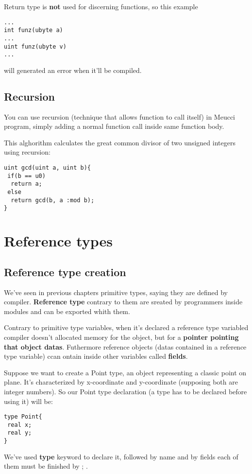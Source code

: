 \documentclass[10pt]{book}%
\renewcommand{\emph}[1]{\textbf{#1}}
\newenvironment{codeenv}{
\begin{mdframed}[backgroundcolor=black!20,topline=false,leftline=false,rightline=false,bottomline=false]
}
{\end{mdframed}}
\begin{document}
Return type is \emph{not} used for discerning functions, so this example
\begin{codeenv}
\begin{verbatim}
...
int funz(ubyte a)
...
uint funz(ubyte v)
...
\end{verbatim}
\end{codeenv}
will generated an error when it'll be compiled.

\section{Recursion}
You can use recursion (technique that allows function to call itself) in Meucci program, simply adding a normal function call inside same function body. 

This alghorithm calculates the great common divisor of two unsigned integers using recursion:
\begin{codeenv}
\begin{verbatim}
uint gcd(uint a, uint b){
 if(b == u0)
  return a;
 else
  return gcd(b, a :mod b);
}
\end{verbatim}
\end{codeenv}

\chapter{Reference types}
\section{Reference type creation}
We've seen in previous chapters primitive types, saying they are defined by compiler. \emph{Reference type} contrary to them are sreated by programmers inside modules and can be exported whith them.

Contrary to primitive type variables, when it's declared a reference type variabled compiler doesn't allocated memory for the object, but for a \emph{pointer pointing that object datas}. Futhermore reference objects (datas contained in a reference type variable) ccan ontain inside other variables called \emph{fields}.

Suppose we want to create a Point type, an object representing a classic point on plane. It's characterized by x-coordinate and y-coordinate (supposing both are integer numbers). So our Point type declaration (a type has to be declared before using it) will be:
\begin{codeenv}
\begin{verbatim}
type Point{
 real x;
 real y;
}
\end{verbatim}
\end{codeenv}
We've used \emph{type} keyword to declare it, followed by name and by fields each of them must be finished by ; .
\end{document}
